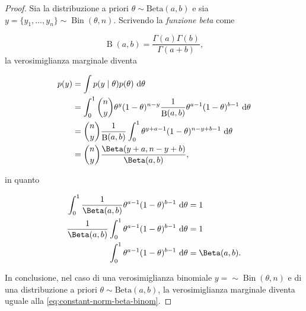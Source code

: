 \documentclass[
  11pt,
]{krantz}
\DeclareMathOperator{\Bin}{Bin} %
\DeclareMathOperator{\B}{B} %
\theoremstyle{definition}
\theoremstyle{definition}
\theoremstyle{definition}
\theoremstyle{definition}
\theoremstyle{remark}
\begin{document}
\begin{proof}
Sia la distribuzione a priori \(\theta \sim \mbox{Beta}(a, b)\) e sia \(y = \{y_1, \dots, y_n\} \sim \Bin(\theta, n)\). Scrivendo la \emph{funzione beta} come

\[
\B(a, b) = \frac{\Gamma(a)\Gamma(b)}{\Gamma(a+b)},
\] la verosimiglianza marginale diventa

\begin{align}
p(y) &= \int p(y \mid \theta) p(\theta) \,\operatorname {d}\!\theta \notag\\
&= \int_0^1 \binom{n}{y}\theta^{y} (1 - \theta)^{n- y} \frac{1}{\B(a,b)} \theta^{a-1} (1-\theta)^{b-1} \,\operatorname {d}\!\theta \notag\\
&= \binom{n}{y}\frac{1}{\B(a,b)} \int_0^1 \theta^{y + a - 1} (1-\theta)^{n- y + b-1}  \,\operatorname {d}\!\theta \notag\\
&= \binom{n}{y}\frac{\Beta(y + a, n- y + b)}{\Beta(a,b)},
\label{eq:constant-norm-beta-binom}
\end{align}

in quanto

\begin{align}
\int_0^1 \frac{1}{\Beta(a,b)} \theta^{a-1} (1-\theta)^{b-1} \,\operatorname {d}\! \theta &= 1\notag\\
\frac{1}{\Beta(a,b)} \int_0^1  \theta^{a-1} (1-\theta)^{b-1} \,\operatorname {d}\! \theta &= 1\notag\\
\int_0^1  \theta^{a-1} (1-\theta)^{b-1} \,\operatorname {d}\!\theta &= \Beta(a,b). \notag
\end{align}

In conclusione, nel caso di una verosimiglianza binomiale \(y = \sim \Bin(\theta, n)\) e di una distribuzione a priori \(\theta \sim \mbox{Beta}(a, b)\), la verosimiglianza marginale diventa uguale alla \eqref{eq:constant-norm-beta-binom}.
\end{proof}
\end{document}
